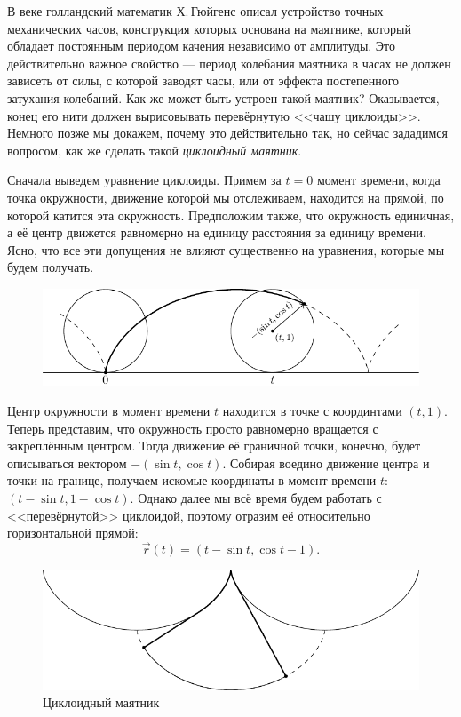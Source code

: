В  веке голландский математик\footnotemark{} Х.\,Гюйгенс описал устройство точных механических часов, конструкция которых основана на маятнике, который обладает постоянным периодом качения независимо от амплитуды. Это действительно важное свойство --- период колебания маятника в часах не должен зависеть от силы, с которой заводят часы, или от эффекта постепенного затухания колебаний. Как же может быть устроен такой маятник? Оказывается, конец его нити должен вырисовывать перевёрнутую <<чашу циклоиды>>. Немного позже мы докажем, почему это действительно так, но сейчас зададимся вопросом, как же сделать такой \textit{циклоидный маятник}.


Сначала выведем уравнение циклоиды. Примем за $t = 0$ момент времени, когда точка окружности, движение которой мы отслеживаем, находится на прямой, по которой катится эта окружность. Предположим также, что окружность единичная, а её центр движется равномерно на единицу расстояния за единицу времени. Ясно, что все эти допущения не влияют существенно на уравнения, которые мы будем получать.

\begin{figure}[H]
	\centering
	\includegraphics[width=12cm]{./img/CycloidEquation.pdf}
	\caption[format=empty]{}
\end{figure}

Центр окружности в момент времени $t$ находится в точке с координтами $(t, 1)$. Теперь представим, что окружность просто равномерно вращается с закреплённым центром. Тогда движение её граничной точки, конечно, будет описываться вектором $-(\sin t, \cos t)$. Собирая воедино движение центра и точки на границе, получаем искомые координаты в момент времени $t$: $(t - \sin t, 1 - \cos t)$. Однако далее мы всё время будем работать с <<перевёрнутой>> циклоидой, поэтому отразим её относительно горизонтальной прямой:
\[
	\vec{r}(t) = (t - \sin t, \cos t - 1).
\]

\begin{figure}[H]
	\centering
	\includegraphics[width=12cm]{./img/Pendulum.pdf}
	\caption{Циклоидный маятник}
	\label{fig:Pendulum}
\end{figure}

